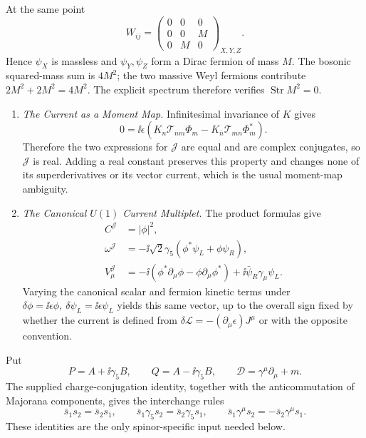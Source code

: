 \begin{enumerate}
\begin{enumerate}
      At the same point
      \[
        W_{ij}=
        \begin{pmatrix}
          0&0&0\\
          0&0&M\\
          0&M&0
        \end{pmatrix}_{X,Y,Z}.
      \]
      Hence \(\psi_X\) is massless and \(\psi_Y,\psi_Z\) form a Dirac
      fermion of mass \(M\).  The bosonic squared-mass sum is
      \(4M^2\); the two massive Weyl fermions contribute
      \(2M^2+2M^2=4M^2\).  The explicit spectrum therefore verifies
      \(\operatorname{Str}M^2=0\).
  \end{enumerate}

  \begin{enumerate}
    \item \emph{The Current as a Moment Map.}
    Infinitesimal invariance of \(K\) gives
      \[
        0=\ii\epsilon\left(
          K_n\mathcal T_{nm}\Phi_m
          -K_{\bar n}\mathcal T_{mn}\Phi_m^*\right).
      \]
      Therefore the two expressions for \(\mathcal J\) are equal and are
      complex conjugates, so \(\mathcal J\) is real.  Adding a real constant
      preserves this property and changes none of its superderivatives or its
      vector current, which is the usual moment-map ambiguity.
    \item \emph{The Canonical \(U(1)\) Current Multiplet.}
    The product formulas give
      \[
      \begin{aligned}
        C^{\mathcal J}&=|\phi|^2,\\
        \omega^{\mathcal J}&=-\ii\sqrt2\gamma_5
           (\phi^*\psi_L+\phi\psi_R),\\
        V_\mu^{\mathcal J}&=-\ii(\phi^*\partial_\mu\phi
           -\phi\partial_\mu\phi^*)
           +\ii\bar\psi_R\gamma_\mu\psi_L.
      \end{aligned}
      \]
      Varying the canonical scalar and fermion kinetic terms under
      \(\delta\phi=\ii\epsilon\phi,\ \delta\psi_L=\ii\epsilon\psi_L\) yields this
      same vector, up to the overall sign fixed by whether the current is
      defined from \(\delta\mathcal L=-(\partial_\mu\epsilon)J^\mu\) or with
      the opposite convention.
  \end{enumerate}

  Put
  \[
    P=A+\ii\gamma_5B,\qquad Q=A-\ii\gamma_5B,\qquad
    \mathscr D=\gamma^\mu\partial_\mu+m.
  \]
  The supplied charge-conjugation identity, together with the
  anticommutation of Majorana components, gives the interchange rules
  \[
    \bar s_1s_2=\bar s_2s_1,\qquad
    \bar s_1\gamma_5s_2=\bar s_2\gamma_5s_1,\qquad
    \bar s_1\gamma^\mu s_2=-\bar s_2\gamma^\mu s_1.
  \]
  These identities are the only spinor-specific input needed below.


\end{enumerate}
